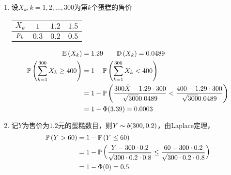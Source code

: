 \begin{analysis}
\begin{enumerate}
	\item 设$X_k,k=1,2,\ldots,300$为第$k$个蛋糕的售价
	\begin{center}
	\begin{tabular}{c|ccc}
	$X_k$ & $1$ & $1.2$ & $1.5$\\\hline
	$p_k$ & $0.3$ & $0.2$ & $0.5$
	\end{tabular}
	\end{center}
	\[\begin{aligned}
	\mathbb{E}\left(X_k\right)&=1.29 \qquad \mathbb{D}\left(X_k\right)=0.0489\\
	\mathbb{P}\left(\sum_{k=1}^{300}X_k\geq 400\right)&=1-\mathbb{P}\left(\sum_{k=1}^{300}X_k<400\right)\\
	&=1-\mathbb{P}\left(\frac{300\bar{X}-1.29\cdot 300}{\sqrt{300}{0.0489}}<\frac{400-1.29\cdot 300}{\sqrt{300}{0.0489}}\right)\\
	&=1-\Phi(3.39)=0.0003
	\end{aligned}\]
	\item 记$Y$为售价为$1.2$元的蛋糕数目，则$Y\thicksim b(300,0.2)$，由Laplace定理，
	\[\begin{aligned}
	\mathbb{P}\left(Y>60\right)&=1-\mathbb{P}\left(Y\leq 60\right)\\
	&=1-\mathbb{P}\left(\frac{Y-300\cdot 0.2}{\sqrt{300\cdot 0.2\cdot 0.8}}\leq\frac{60-300\cdot 0.2}{\sqrt{300\cdot 0.2\cdot 0.8}}\right)\\
	&=1-\Phi(0)=0.5
	\end{aligned}\]
\end{enumerate}
\end{analysis}